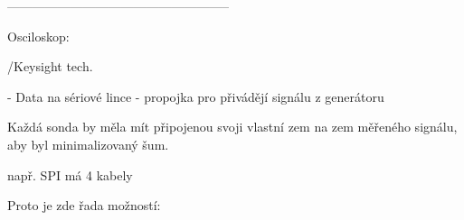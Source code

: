    
  
  -----------------------------------------------------
  
   Osciloskop: 
   
   /Keysight tech.
   
   
   - Data na sériové lince 
   - propojka pro přivádějí signálu z generátoru 

   Každá sonda by měla mít  připojenou svoji vlastní zem na zem měřeného signálu, aby byl minimalizovaný šum.
   
   např. SPI má 4 kabely 
   
   Proto je zde řada možností: 
 


 
 



 

 

